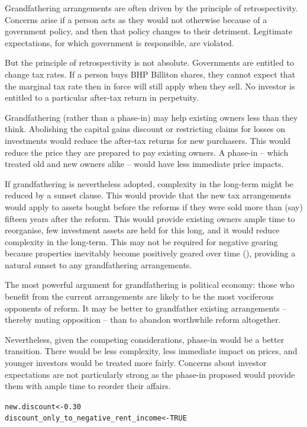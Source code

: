 \documentclass{grattan}\usepackage[]{graphicx}\usepackage[]{color}
\makeatletter
\newcommand{\hlnum}[1]{\textcolor[rgb]{0.686,0.059,0.569}{#1}}%
\newcommand{\hlstd}[1]{\textcolor[rgb]{0.345,0.345,0.345}{#1}}%
\newcommand{\hlkwb}[1]{\textcolor[rgb]{0.69,0.353,0.396}{#1}}%
\newenvironment{kframe}{%
 \def\at@end@of@kframe{}%
 \ifinner\ifhmode%
  \def\at@end@of@kframe{\end{minipage}}%
  \begin{minipage}{\columnwidth}%
 \fi\fi%
 \def\FrameCommand##1{\hskip\@totalleftmargin \hskip-\fboxsep
 \colorbox{shadecolor}{##1}\hskip-\fboxsep
     \hskip-\linewidth \hskip-\@totalleftmargin \hskip\columnwidth}%
 \MakeFramed {\advance\hsize-\width
   \@totalleftmargin\z@ \linewidth\hsize
   \@setminipage}}%
 {\par\unskip\endMakeFramed%
 \at@end@of@kframe}
\newenvironment{knitrout}{}{} %
\makeatother
\begin{document}
Grandfathering arrangements are often driven by the principle of retrospectivity. Concerns arise if a person acts as they would not otherwise because of a government policy, and then that policy changes to their detriment. Legitimate expectations, for which government is responsible, are violated. 

But the principle of retrospectivity is not absolute. Governments are entitled to change tax rates. If a person buys BHP Billiton shares, they cannot expect that the marginal tax rate then in force will still apply when they sell. No investor is entitled to a particular after-tax return in perpetuity.

Grandfathering (rather than a phase-in) may help existing owners less than they think. Abolishing the capital gains discount or restricting claims for losses on investments would reduce the after-tax returns for new purchasers. This would reduce the price they are prepared to pay existing owners. A phase-in -- which treated old and new owners alike -- would have less immediate price impacts.

If grandfathering is nevertheless adopted, complexity in the long-term might be reduced by a sunset clause. This would provide that the new tax arrangements would apply to assets bought before the reforms if they were sold more than (say) fifteen years after the reform. This would provide existing owners ample time to reorganise, few investment assets are held for this long, and it would reduce complexity in the long-term. This may not be required for negative gearing because properties inevitably become positively geared over time (), providing a natural sunset to any grandfathering arrangements.

The most powerful argument for grandfathering is political economy: those who benefit from the current arrangements are likely to be the most vociferous opponents of reform. It may be better to grandfather existing arrangements -- thereby muting opposition -- than to abandon worthwhile reform altogether.  

Nevertheless, given the competing considerations, phase-in would be a better transition. There would be less complexity, less immediate impact on prices, and younger investors would be treated more fairly. Concerns about investor expectations are not particularly strong as the phase-in proposed would provide them with ample time to reorder their affairs.


\onecolumn
\begin{knitrout}
\color{fgcolor}\begin{kframe}
\begin{alltt}
\hlstd{new.discount} \hlkwb{<-} \hlnum{0.30}
\hlstd{discount_only_to_negative_rent_income} \hlkwb{<-} \hlnum{TRUE}
\end{alltt}
\end{kframe}
\end{knitrout}
\end{document}
